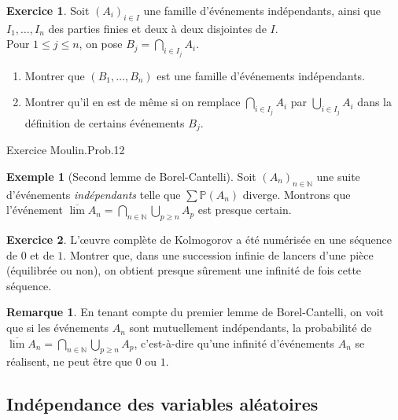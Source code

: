 \documentclass[french]{article}
\renewcommand{\P}{\mathbb{P}}
\newcommand{\N}{\mathbb{N}}
\theoremstyle{plain}
\theoremstyle{definition}
\newtheorem*{ex}{Exemple}
\newtheorem{exo}{Exercice}
\newtheorem*{rmq}{Remarque}
\theoremstyle{remark}
\begin{document}
\begin{exo}
	Soit $(A_i)_{i\in I}$ une famille d'événements indépendants, ainsi que $I_1,\ldots,I_n$ des parties finies et deux à deux disjointes de $I$. \\
	Pour $1\leqslant j\leqslant n$, on pose $B_j=\displaystyle\bigcap_{i\in I_j}A_i$.
	\begin{enumerate}
		\item Montrer que $(B_1,\ldots,B_n)$ est une famille d'événements indépendants.
		\item Montrer qu'il en est de même si on remplace $\displaystyle\bigcap_{i\in I_j}A_i$ par $\displaystyle\bigcup_{i\in I_j}A_i$ dans la définition de certains événements $B_j$.
	\end{enumerate}
\end{exo}

Exercice Moulin.Prob.12

\begin{ex}[Second lemme de Borel-Cantelli]
	Soit $(A_n)_{n\in\N}$ une suite d'événements \textit{indépendants} telle que $\displaystyle\sum\P(A_n)$ diverge. Montrons que l'événement $\overline{\lim}A_n=\displaystyle\bigcap_{n\in\N}\bigcup_{p\geqslant n}A_p$ est presque certain.
\end{ex}

\begin{exo}
	L'œuvre complète de Kolmogorov a été  numérisée en une séquence de $0$ et de $1$. Montrer que, dans une succession infinie de lancers d'une pièce (équilibrée ou non), on obtient presque sûrement une infinité de fois cette séquence.
\end{exo}

\begin{rmq}
	En tenant compte du premier lemme de Borel-Cantelli, on voit que si les événements $A_n$ sont mutuellement indépendants, la probabilité de $\overline{\lim}A_n=\displaystyle\bigcap_{n\in\N}\bigcup_{p\geqslant n}A_p$, c'est-à-dire qu'une infinité d'événements $A_n$ se réalisent, ne peut être que $0$ ou $1$.
\end{rmq}

\subsection{Indépendance des variables aléatoires}
\end{document}
